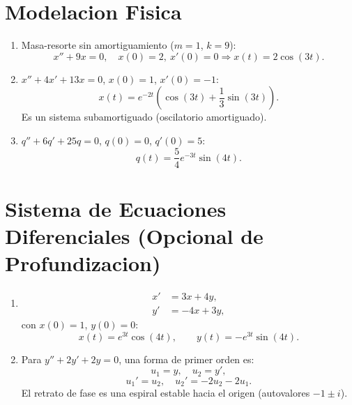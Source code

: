 \documentclass[12pt,a4paper]{article}
\begin{document}
\section{Modelacion Fisica}
\begin{enumerate}
    \item Masa-resorte sin amortiguamiento ($m=1$, $k=9$):
    $$x''+9x=0,\quad x(0)=2,\ x'(0)=0 \Rightarrow x(t)=2\cos(3t).$$

    \item $x''+4x'+13x=0$, $x(0)=1$, $x'(0)=-1$:
    $$x(t)=e^{-2t}\left(\cos(3t)+\frac{1}{3}\sin(3t)\right).$$
    Es un sistema subamortiguado (oscilatorio amortiguado).

    \item $q''+6q'+25q=0$, $q(0)=0$, $q'(0)=5$:
    $$q(t)=\frac{5}{4}e^{-3t}\sin(4t).$$
\end{enumerate}

\section{Sistema de Ecuaciones Diferenciales (Opcional de Profundizacion)}
\begin{enumerate}
    \item
    \begin{align*}
        x' &= 3x+4y,\\
        y' &= -4x+3y,
    \end{align*}
    con $x(0)=1$, $y(0)=0$:
    $$x(t)=e^{3t}\cos(4t),\qquad y(t)=-e^{3t}\sin(4t).$$

    \item Para $y''+2y'+2y=0$, una forma de primer orden es:
    $$u_1=y,\quad u_2=y',$$
    $$u_1'=u_2,\quad u_2'=-2u_2-2u_1.$$
    El retrato de fase es una espiral estable hacia el origen (autovalores $-1\pm i$).
\end{enumerate}
\end{document}
